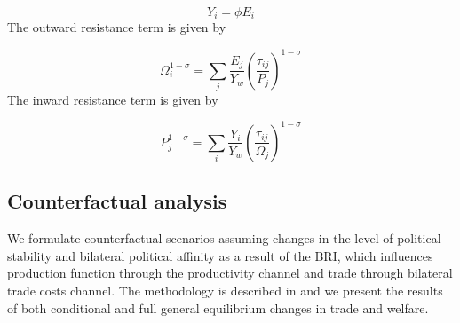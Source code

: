 \begin{equation}
    Y_i=\phi E_i
\end{equation}
The outward resistance term is given by

\begin{equation}
    \Omega_i^{1-\sigma}=\sum_{j} \frac{E_j}{Y_w} \left ( \frac{\tau_{ij}}{P_j} \right )^{1-\sigma}
\end{equation}
The inward resistance term is given by


\begin{equation}
    P_j^{1-\sigma}=\sum_{i} \frac{Y_i}{Y_w} \left ( \frac{\tau_{ij}}{\Omega_{j}} \right ) ^{1-\sigma}
\end{equation}

\subsection{Counterfactual analysis}

We formulate counterfactual scenarios assuming changes in the level of political stability and bilateral political affinity as a result of the BRI, which influences production function through the productivity channel and trade through bilateral trade costs channel. The methodology is described in \cite{Anderson2018GEPPML:PPML} and we present the results of both conditional and full general equilibrium changes in trade and welfare.